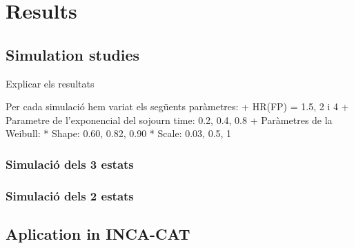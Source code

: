 \documentclass[10pt,a4paper]{article}
\begin{document}
% 
% 

\section{Results}
\subsection{Simulation studies}
Explicar els resultats

Per cada simulació hem variat els següents paràmetres:
  + HR(FP) = 1.5, 2 i 4
  + Parametre de l'exponencial del sojourn time: 0.2, 0.4, 0.8
  + Paràmetres de la Weibull:
    * Shape: 0.60, 0.82, 0.90
    * Scale: 0.03, 0.5, 1

\subsubsection{Simulació dels 3 estats}
\subsubsection{Simulació dels 2 estats}



\subsection{Aplication in INCA-CAT}
\end{document}
